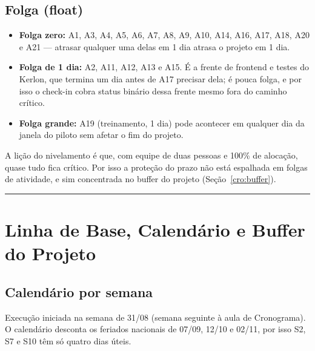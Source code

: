 \documentclass[11pt,a4paper]{article}
\newcommand{\separador}{\par\vspace{2mm}\hrule\vspace{4mm}}
\begin{document}
\subsection{Folga (float)}
\begin{itemize}[itemsep=2pt]
  \item \textbf{Folga zero:} A1, A3, A4, A5, A6, A7, A8, A9, A10, A14, A16, A17, A18, A20 e A21 --- atrasar qualquer uma delas em 1 dia atrasa o projeto em 1 dia.
  \item \textbf{Folga de 1 dia:} A2, A11, A12, A13 e A15. É a frente de frontend e testes do Kerlon, que termina um dia antes de A17 precisar dela; é pouca folga, e por isso o check-in cobra status binário dessa frente mesmo fora do caminho crítico.
  \item \textbf{Folga grande:} A19 (treinamento, 1 dia) pode acontecer em qualquer dia da janela do piloto sem afetar o fim do projeto.
\end{itemize}
\noindent A lição do nivelamento é que, com equipe de duas pessoas e 100\% de alocação, quase tudo fica crítico. Por isso a proteção do prazo não está espalhada em folgas de atividade, e sim concentrada no buffer do projeto (Seção~\ref{cro:buffer}).

\separador

\section{Linha de Base, Calendário e Buffer do Projeto}\label{cro:linhabase}

\subsection{Calendário por semana}\label{cro:calendario}
Execução iniciada na semana de 31/08 (semana seguinte à aula de Cronograma). O calendário desconta os feriados nacionais de 07/09, 12/10 e 02/11, por isso S2, S7 e S10 têm só quatro dias úteis.
\end{document}
